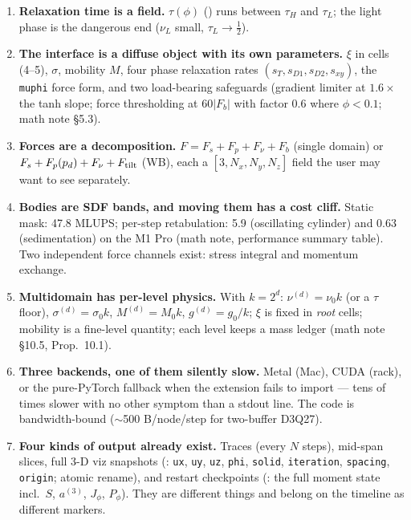 \documentclass[11pt,a4paper]{article}
\newcommand{\pd}{p_d}
\newcommand{\code}[1]{\texttt{#1}}
\begin{document}
\begin{enumerate}[leftmargin=2em]
  closures $a^{(3)}$ are the hydro state. Dissipation $2\nu S\!:\!S$, enstrophy and
  $Q$ come without finite differencing.
\item \textbf{Relaxation time is a field.} $\tau(\phi)$ () runs
  between $\tau_H$ and $\tau_L$; the light phase is the dangerous end
  ($\nu_L$ small, $\tau_L\to\tfrac12$).
\item \textbf{The interface is a diffuse object with its own parameters.} $\xi$ in
  cells (4--5), $\sigma$, mobility $M$, four phase relaxation rates
  $(s_T, s_{D1}, s_{D2}, s_{xy})$, the \code{muphi} force form, and two
  load-bearing safeguards (gradient limiter at $1.6\times$ the tanh slope; force
  thresholding at $60|F_b|$ with factor $0.6$ where $\phi<0.1$; math note \S5.3).
\item \textbf{Forces are a decomposition.} $F = F_s + F_p + F_\nu + F_b$
  (single domain) or $F_s + F_p(\pd) + F_\nu + F_{\rm tilt}$ (WB), each a
  $[3,N_x,N_y,N_z]$ field the user may want to see separately.
\item \textbf{Bodies are SDF bands, and moving them has a cost cliff.} Static mask:
  47.8 MLUPS; per-step retabulation: 5.9 (oscillating cylinder) and 0.63
  (sedimentation) on the M1 Pro (math note, performance summary table). Two
  independent force channels exist: stress integral and momentum exchange.
\item \textbf{Multidomain has per-level physics.} With $k=2^d$:
  $\nu^{(d)}=\nu_0 k$ (or a $\tau$ floor), $\sigma^{(d)}=\sigma_0 k$,
  $M^{(d)}=M_0 k$, $g^{(d)}=g_0/k$; $\xi$ is fixed in \emph{root} cells; mobility is a
  fine-level quantity; each level keeps a mass ledger (math note \S10.5, Prop.~10.1).
\item \textbf{Three backends, one of them silently slow.} Metal (Mac), CUDA
  (rack), or the pure-PyTorch fallback when the extension fails to import --- tens of
  times slower with no other symptom than a stdout line. The code is
  bandwidth-bound ($\sim$500 B/node/step for two-buffer D3Q27).
\item \textbf{Four kinds of output already exist.} Traces (every $N$ steps),
  mid-span slices, full 3-D viz snapshots (:
  \code{ux}, \code{uy}, \code{uz}, \code{phi}, \code{solid}, \code{iteration}, \code{spacing}, \code{origin}; atomic rename), and restart
  checkpoints (: the full moment state incl.\ $S$, $a^{(3)}$,
  $J_\phi$, $P_\phi$). They are different things and belong on the timeline as
  different markers.
\end{enumerate}
\end{document}
